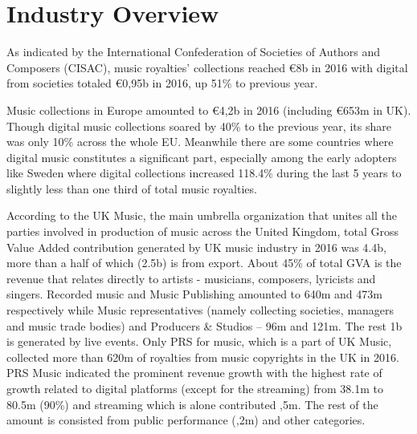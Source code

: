 \documentclass[12pt]{report}
\begin{document}
\chapter{Industry Overview}
\label{industry}
As indicated by the International Confederation of Societies of Authors and Composers (CISAC), music royalties’ collections reached \euro 8b in 2016 with digital from societies totaled \euro 0,95b in 2016, up 51\% to previous year.

Music collections in Europe amounted to \euro 4,2b in 2016 (including \euro 653m in UK). Though digital music collections soared by 40\% to the previous year, its share was only 10\% across the whole EU. Meanwhile there are some countries where digital music constitutes a significant part, especially among the early adopters like Sweden where digital collections increased 118.4\% during the last 5 years to slightly less than one third of total music royalties.
 
According to the UK Music, the main umbrella organization that unites all the parties involved in production of music across the United Kingdom, total Gross Value Added contribution generated by UK music industry in 2016 was \textsterling 4.4b, more than a half of which (\textsterling 2.5b) is from export. About 45\% of total GVA is the revenue that relates directly to artists - musicians, composers, lyricists and singers. Recorded music and Music Publishing amounted to \textsterling 640m and \textsterling 473m respectively while Music representatives (namely collecting societies, managers and music trade bodies) and Producers \& Studios – \textsterling 96m and \textsterling 121m. The rest \textsterling 1b is generated by live events.  Only PRS for music, which is a part of UK Music, collected more than \textsterling 620m of royalties from music copyrights in the UK in 2016. PRS Music indicated the prominent revenue growth with the highest rate of growth related to digital platforms (except for the streaming) from \textsterling 38.1m to \textsterling 80.5m (90\%) and streaming which is alone contributed ,5m. The rest of the amount is consisted from public performance (,2m) and other categories.
                                                                                                                                          	
\end{document}
